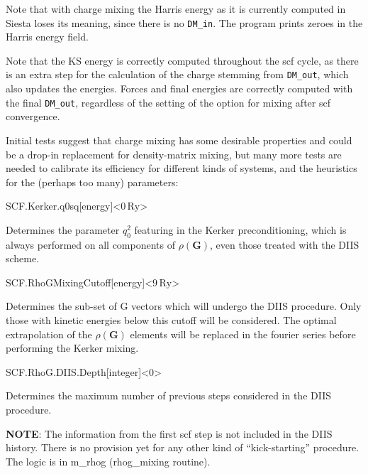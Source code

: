 Note that with charge mixing the Harris energy as it is currently
computed in Siesta loses its meaning, since there is no
\texttt{DM\_in}. The program prints zeroes in the Harris energy field.

Note that the KS energy is correctly computed throughout the scf
cycle, as there is an extra step for the calculation of the charge
stemming from \texttt{DM\_out}, which also updates the
energies. Forces and final energies are correctly computed with the
final \texttt{DM\_out}, regardless of the setting of the option for
mixing after scf convergence.

Initial tests suggest that charge mixing has some desirable properties
and could be a drop-in replacement for density-matrix mixing, but many
more tests are needed to calibrate its efficiency for different kinds
of systems, and the heuristics for the (perhaps too many) parameters:


\begin{fdfentry}{SCF.Kerker.q0sq}[energy]<$0\,\mathrm{Ry}$>

  Determines the parameter $q_0^2$ featuring in the Kerker
  preconditioning, which is always performed on all components of
  $\rho(\mathbf{G})$, even those treated with the DIIS scheme. 
  
\end{fdfentry}

\begin{fdfentry}{SCF.RhoGMixingCutoff}[energy]<$9\,\mathrm{Ry}$>

  Determines the sub-set of G vectors which will undergo the DIIS
  procedure.  Only those with kinetic energies below this cutoff will
  be considered.  The optimal extrapolation of the $\rho(\textbf{G})$
  elements will be replaced in the fourier series before performing
  the Kerker mixing.
  
\end{fdfentry}

\begin{fdfentry}{SCF.RhoG.DIIS.Depth}[integer]<0>

  Determines the maximum number of previous steps considered in the DIIS
  procedure. 
  
\end{fdfentry}


\textbf{NOTE}: The information from the first scf step is not included in
the DIIS history. There is no provision yet for any other kind of
``kick-starting'' procedure. The logic is in m\_rhog (rhog\_mixing routine).

